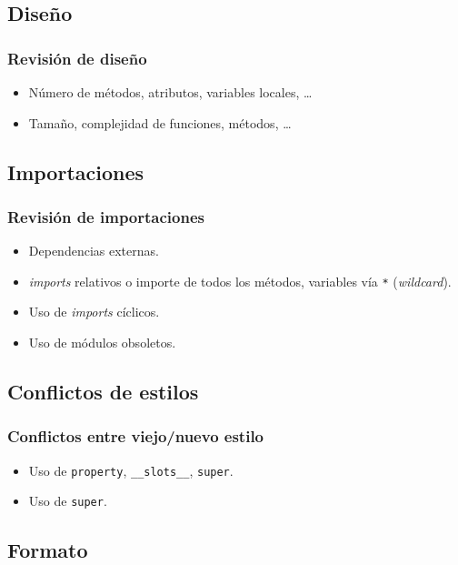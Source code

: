 \documentclass{beamer}
\begin{document}
\subsection{Diseño}

\begin{frame}
    \frametitle{Revisión de diseño}

    \begin{itemize}
          \item Número de métodos, atributos, variables locales, \ldots
          \item Tamaño, complejidad de funciones, métodos, \ldots
    \end{itemize}
\end{frame}

\subsection{Importaciones}

\begin{frame}
    \frametitle{Revisión de importaciones}

    \begin{itemize}
          \item Dependencias externas.
          \item \emph{imports} relativos o importe de todos los métodos, variables vía \texttt{*} (\emph{wildcard}).
          \item Uso de \emph{imports} cíclicos.
          \item Uso de módulos obsoletos.
    \end{itemize}
\end{frame}

\subsection{Conflictos de estilos}

\begin{frame}
    \frametitle{Conflictos entre viejo/nuevo estilo}

    \begin{itemize}
          \item Uso de \texttt{property}, \texttt{\_\_slots\_\_}, \texttt{super}.
          \item Uso de \texttt{super}.
    \end{itemize}
\end{frame}

\subsection{Formato}
\end{document}
